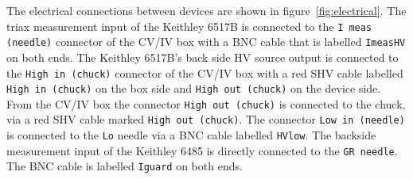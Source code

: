 \documentclass[a4paper]{article}
\begin{document}
The electrical connections between devices are shown in figure~\ref{fig:electrical}.
The triax measurement input of the Keithley 6517B is connected to the {\tt I meas (needle)} connector of the CV/IV box with a BNC cable that is labelled {\tt ImeasHV} on both ends.
The Keithley 6517B's back side HV source output is connected to the {\tt High in (chuck)} connector of the CV/IV box with a red SHV cable labelled {\tt High in (chuck)} on the box side and {\tt High out (chuck)} on the device side.
From the CV/IV box the connector {\tt High out (chuck)} is connected to the chuck, via a red SHV cable marked {\tt High out (chuck)}.
The connector {\tt Low in (needle)} is connected to the {\tt Lo} needle via a BNC cable labelled {\tt HVlow}.
The backside measurement input of the Keithley 6485 is directly connected to the {\tt GR needle}.
The BNC cable is labelled {\tt Iguard} on both ends.\\
\end{document}
